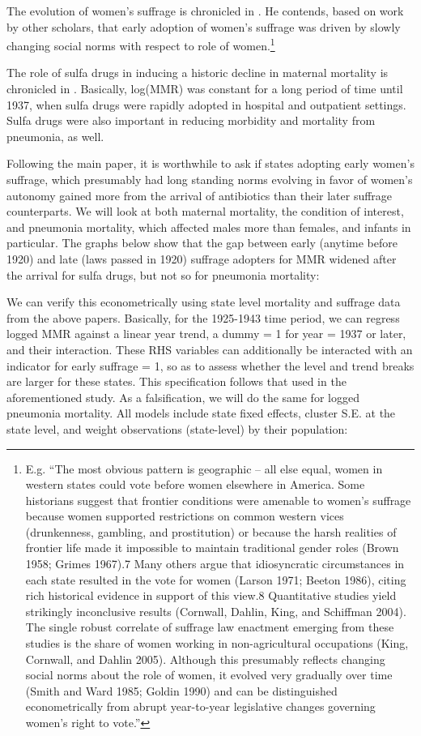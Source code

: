 \documentclass[11pt]{article}
\begin{document}
\begin{spacing}{1.4}
The evolution of women's suffrage is chronicled in \citet{miller2008women}. He contends, based on work by other scholars, that early adoption of women's suffrage was driven by slowly changing social norms with respect to role of women.\footnote{E.g. ``The most obvious pattern is geographic – all else equal, women in western states could vote before women elsewhere in America. Some historians suggest that frontier conditions were amenable to women’s suffrage because women supported restrictions on common western vices (drunkenness, gambling, and prostitution) or because the harsh realities of frontier life made it impossible to maintain traditional gender roles (Brown 1958; Grimes 1967).7 Many others argue that idiosyncratic circumstances in each state resulted in the vote for women (Larson 1971; Beeton 1986), citing rich historical evidence in support of this view.8 Quantitative studies yield strikingly inconclusive results (Cornwall, Dahlin, King, and Schiffman 2004). The single robust correlate of suffrage law enactment emerging from these studies is the share of women working in non-agricultural occupations (King, Cornwall, and Dahlin 2005). Although this presumably reflects changing social norms about the role of women, it evolved very gradually over time (Smith and Ward 1985; Goldin 1990) and can be distinguished econometrically from abrupt year-to-year legislative changes governing women’s right to vote.'' }  

The role of sulfa drugs in inducing a historic decline in maternal mortality is chronicled in \citet{jayachandran2008mortality}. Basically, log(MMR) was constant for a long period of time until 1937, when sulfa drugs were rapidly adopted in hospital and outpatient settings. Sulfa drugs were also important in reducing morbidity and mortality from pneumonia, as well. 

Following the main paper, it is worthwhile to ask if states adopting early women's suffrage, which presumably had long standing norms evolving in favor of women's autonomy gained more from the arrival of antibiotics than their later suffrage counterparts. We will look at both maternal mortality, the condition of interest, and pneumonia mortality, which affected males more than females, and infants in particular. The graphs below show that the gap between early (anytime before 1920) and late (laws passed in 1920) suffrage adopters for MMR widened after the arrival for sulfa drugs, but not so for pneumonia mortality:


We can verify this econometrically using state level mortality and suffrage data from the above papers. Basically, for the 1925-1943 time period, we can regress logged MMR against a linear year trend, a dummy = 1 for year = 1937 or later, and their interaction. These RHS variables can additionally be interacted with an indicator for early suffrage = 1, so as to assess whether the level and trend breaks are larger for these states. This specification follows that used in the aforementioned \citet{jayachandran2008mortality} study. As a falsification, we will do the same for logged pneumonia mortality. All models include state fixed effects, cluster S.E. at the state level, and weight observations (state-level) by their population:


\end{spacing}
\end{document}

